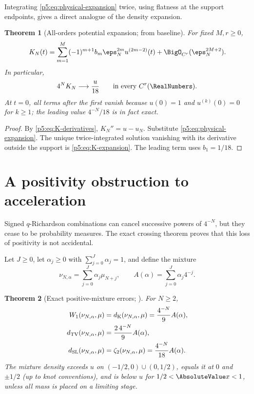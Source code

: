 \documentclass[11pt,oneside]{article}
\numberwithin{equation}{section}
\newtheorem{theorem}{Theorem}[section]
\theoremstyle{definition}
\theoremstyle{remark}
\begin{document}
Integrating \eqref{p5:eq:physical-expansion} twice, using flatness at the support endpoints, gives a direct analogue of the density expansion.

\begin{theorem}[All-orders potential expansion; \newresult from baseline]
For fixed $M,r\ge0$,
\begin{equation}
 K_N(t)=\sum_{m=1}^{M}(-1)^{m+1}b_m\eps_N^{2m}u^{(2m-2)}(t)
 +\BigO_{C^r}(\eps_N^{2M+2}).
 \label{p5:eq:K-expansion}
\end{equation}
In particular,
\begin{equation}
 4^NK_N\longrightarrow\frac{u}{18}
 \qquad\text{in every }C^r(\RealNumbers).
 \label{p5:eq:K-leading}
\end{equation}
At $t=0$, all terms after the first vanish because $u(0)=1$ and $u^{(k)}(0)=0$ for $k\ge1$; the leading value $4^{-N}/18$ is in fact exact.
\end{theorem}

\begin{proof}
By \eqref{p5:eq:K-derivatives}, $K_N''=u-u_N$.  Substitute \eqref{p5:eq:physical-expansion}.  The unique twice-integrated solution vanishing with its derivative outside the support is \eqref{p5:eq:K-expansion}.  The leading term uses $b_1=1/18$.
\end{proof}

\section{A positivity obstruction to acceleration}
\label{p5:sec:no-go}

Signed $q$-Richardson combinations can cancel successive powers of $4^{-N}$, but they cease to be probability measures.  The exact crossing theorem proves that this loss of positivity is not accidental.

Let $J\ge0$, let $\alpha_j\ge0$ with $\sum_{j=0}^{J}\alpha_j=1$, and define the mixture
\begin{equation}
 \nu_{N,\alpha}=\sum_{j=0}^{J}\alpha_j\mu_{N+j},
 \qquad
 A(\alpha)=\sum_{j=0}^{J}\alpha_j4^{-j}.
 \label{p5:eq:mixture}
\end{equation}

\begin{theorem}[Exact positive-mixture errors; \newresult]
For $N\ge2$,
\begin{align}
 W_1(\nu_{N,\alpha},\mu)
 &=d_{\rm K}(\nu_{N,\alpha},\mu)
 =\frac{4^{-N}}9A(\alpha),
 \label{p5:eq:mix-w1}\\
 d_{\rm TV}(\nu_{N,\alpha},\mu)
 &=\frac{2\,4^{-N}}9A(\alpha),
 \label{p5:eq:mix-tv}\\
 d_{\rm SL}(\nu_{N,\alpha},\mu)
 &=\zeta_2(\nu_{N,\alpha},\mu)
 =\frac{4^{-N}}{18}A(\alpha).
 \label{p5:eq:mix-sl}
\end{align}
The mixture density exceeds $u$ on $(-1/2,0)\cup(0,1/2)$, equals it at $0$ and $\pm1/2$ (up to knot conventions), and is below $u$ for $1/2<\AbsoluteValue x<1$, unless all mass is placed on a limiting stage.
\end{theorem}
\end{document}
